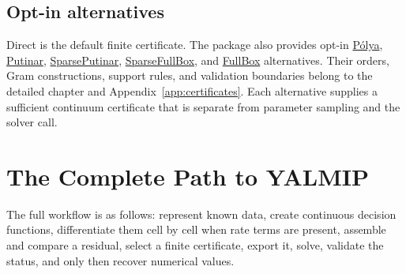 \subsection{Opt-in alternatives}

Direct is the default finite certificate. The package also provides opt-in \hyperref[sec:pdlmi-polya]{P\'olya}, \hyperref[sec:pdlmi-putinar]{Putinar}, \hyperref[sec:pdlmi-sparse-putinar]{SparsePutinar}, \hyperref[sec:pdlmi-sparse-full-box]{SparseFullBox}, and \hyperref[sec:pdlmi-full-box]{FullBox} alternatives. Their orders, Gram constructions, support rules, and validation boundaries belong to the detailed  chapter and Appendix~\ref{app:certificates}. Each alternative supplies a sufficient continuum certificate that is separate from parameter sampling and the solver call.

\section{The Complete Path to YALMIP}

The full workflow is as follows: represent known data, create continuous decision functions, differentiate them cell by cell when rate terms are present, assemble and compare a residual, select a finite certificate, export it, solve, validate the status, and only then recover numerical values.

